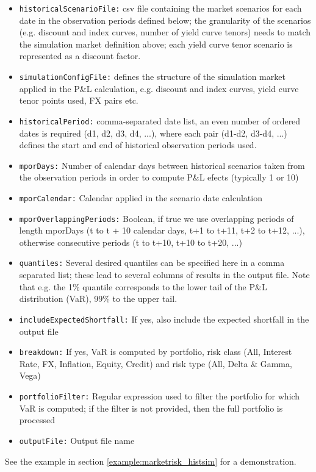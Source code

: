 {\begin{itemize}
\item {\tt historicalScenarioFile:} csv file containing the market scenarios for each date in the observation periods defined below; the granularity of the scenarios (e.g. discount and index curves, number of yield curve tenors) needs to match the simulation market definition above; each yield curve tenor scenario is represented as a discount factor.
\item {\tt simulationConfigFile:} defines the structure of the simulation market applied in the P&L calculation, e.g. discount and index curves, yield curve tenor points used, FX pairs etc.
\item {\tt historicalPeriod:} comma-separated date list, an even number of ordered dates is required (d1, d2, d3, d4, ...), where each pair (d1-d2, d3-d4, ...) defines the start and end of historical observation periods used.
\item {\tt mporDays:} Number of calendar days between historical scenarios taken from the observation periods in order to compute P&L efects (typically 1 or 10)
\item {\tt mporCalendar:} Calendar applied in the scenario date calculation
\item {\tt mporOverlappingPeriods:} Boolean, if true we use overlapping periods of length mporDays (t to t + 10 calendar days, t+1 to t+11, t+2 to t+12, ...), otherwise consecutive periods (t to t+10, t+10 to t+20, ...)
\item {\tt quantiles:} Several desired quantiles can be specified here in a comma separated list; these lead to several columns of results in the output file. Note that e.g. the 1\% quantile corresponds to the lower tail of the P\&L distribution (VaR), 99\% to the upper tail.
\item {\tt includeExpectedShortfall:} If yes, also include the expected shortfall in the output file
\item {\tt breakdown:} If yes, VaR is computed by portfolio, risk class (All, Interest Rate, FX, Inflation, Equity, Credit) and risk type (All, Delta \& Gamma, Vega)
\item {\tt portfolioFilter:} Regular expression used to filter the portfolio for which VaR is computed; if the filter is not provided, then the full portfolio is processed
\item {\tt outputFile:} Output file name
\end{itemize}

See the example in section \ref{example:marketrisk_histsim} for a demonstration.

}
